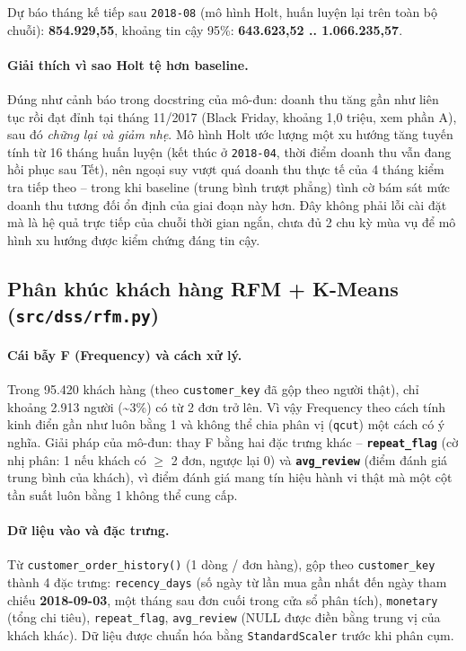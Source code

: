 \documentclass[12pt,a4paper]{article}
\newcommand{\code}[1]{\texttt{\small #1}}
\begin{document}
Dự báo tháng kế tiếp sau \code{2018-08} (mô hình Holt, huấn luyện lại trên toàn bộ chuỗi): \textbf{854.929,55},
khoảng tin cậy 95\%: \textbf{643.623,52 .. 1.066.235,57}.

\paragraph{Giải thích vì sao Holt tệ hơn baseline.} Đúng như cảnh báo trong docstring của mô-đun: doanh thu
tăng gần như liên tục rồi đạt đỉnh tại tháng 11/2017 (Black Friday, khoảng 1,0 triệu, xem phần A), sau đó
\emph{chững lại và giảm nhẹ}. Mô hình Holt ước lượng một xu hướng tăng tuyến tính từ 16 tháng huấn luyện (kết
thúc ở \code{2018-04}, thời điểm doanh thu vẫn đang hồi phục sau Tết), nên ngoại suy vượt quá doanh thu thực
tế của 4 tháng kiểm tra tiếp theo -- trong khi baseline (trung bình trượt phẳng) tình cờ bám sát mức doanh thu
tương đối ổn định của giai đoạn này hơn. Đây không phải lỗi cài đặt mà là hệ quả trực tiếp của chuỗi thời gian
ngắn, chưa đủ 2 chu kỳ mùa vụ để mô hình xu hướng được kiểm chứng đáng tin cậy.

\subsection{Phân khúc khách hàng RFM + K-Means (\code{src/dss/rfm.py})}

\paragraph{Cái bẫy F (Frequency) và cách xử lý.} Trong 95.420 khách hàng (theo \code{customer\_key} đã gộp
theo người thật), chỉ khoảng 2.913 người (\textasciitilde 3\%) có từ 2 đơn trở lên. Vì vậy Frequency theo
cách tính kinh điển gần như luôn bằng 1 và không thể chia phân vị (\code{qcut}) một cách có ý nghĩa. Giải
pháp của mô-đun: thay F bằng hai đặc trưng khác --
\textbf{\code{repeat\_flag}} (cờ nhị phân: 1 nếu khách có \(\ge\) 2 đơn, ngược lại 0) và
\textbf{\code{avg\_review}} (điểm đánh giá trung bình của khách), vì điểm đánh giá mang tín hiệu hành vi thật
mà một cột tần suất luôn bằng 1 không thể cung cấp.

\paragraph{Dữ liệu vào và đặc trưng.} Từ \code{customer\_order\_history()} (1 dòng / đơn hàng), gộp theo
\code{customer\_key} thành 4 đặc trưng: \code{recency\_days} (số ngày từ lần mua gần nhất đến ngày tham chiếu
\textbf{2018-09-03}, một tháng sau đơn cuối trong cửa sổ phân tích), \code{monetary} (tổng chi tiêu),
\code{repeat\_flag}, \code{avg\_review} (NULL được điền bằng trung vị của khách khác). Dữ liệu được chuẩn hóa
bằng \code{StandardScaler} trước khi phân cụm.
\end{document}
